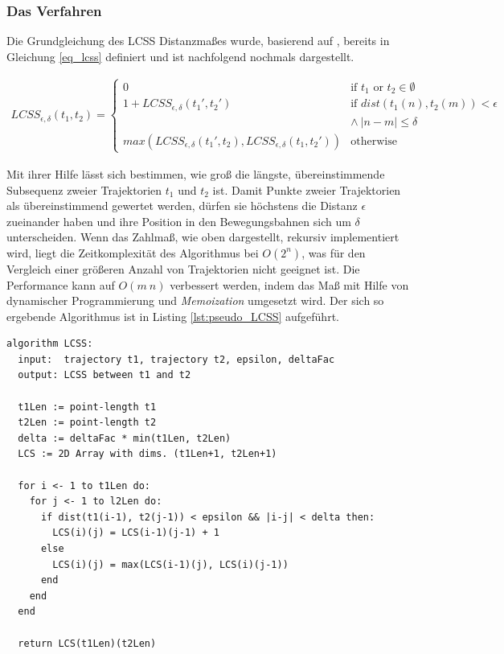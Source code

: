 \subsubsection{Das Verfahren}

Die Grundgleichung des LCSS Distanzmaßes wurde, basierend auf \cite[]{Vlachos2002}, bereits in Gleichung
\ref{eq_lcss} definiert und ist nachfolgend nochmals dargestellt.

\begin{ceqn}
\begin{align*}
\label{eq_lcss}
    LCSS_{\epsilon, \delta}(t_1, t_2) =
    \begin{cases}
        0 & \text{if } t_1 \text{ or } t_2 \in \emptyset \\
        1 + LCSS_{\epsilon, \delta}(t_1', t_2') & \text{if } dist(t_1(n), t_2(m)) < \epsilon \\
        & \land\ |n - m| \leq \delta \\
        max(LCSS_{\epsilon, \delta}(t_1', t_2), LCSS_{\epsilon, \delta}(t_1, t_2')) & \text{otherwise}
    \end{cases}
\end{align*}
\end{ceqn}

Mit ihrer Hilfe lässt sich bestimmen, wie groß die längste, übereinstimmende Subsequenz zweier Trajektorien
$t_1$ und $t_2$ ist. Damit Punkte zweier Trajektorien als übereinstimmend gewertet werden, dürfen sie
höchstens die Distanz $\epsilon$ zueinander haben und ihre Position in den Bewegungsbahnen sich um $\delta$
unterscheiden.
Wenn das Zahlmaß, wie oben dargestellt, rekursiv implementiert wird, liegt die Zeitkomplexität des Algorithmus
bei $O(2^n)$, was für den Vergleich einer größeren Anzahl von Trajektorien nicht geeignet ist. Die Performance
kann auf $O(m\ n)$ verbessert werden, indem das Maß mit Hilfe von dynamischer Programmierung und \textit{Memoization}
umgesetzt wird. Der sich so ergebende Algorithmus ist in Listing \ref{lst:pseudo_LCSS} aufgeführt.
\begin{lstlisting}[caption=Pseudocode LCSS Bestimmung, language=Pseudo, label=lst:pseudo_LCSS]
algorithm LCSS:
  input:  trajectory t1, trajectory t2, epsilon, deltaFac
  output: LCSS between t1 and t2

  t1Len := point-length t1
  t2Len := point-length t2
  delta := deltaFac * min(t1Len, t2Len)
  LCS := 2D Array with dims. (t1Len+1, t2Len+1)

  for i <- 1 to t1Len do:
    for j <- 1 to l2Len do:
      if dist(t1(i-1), t2(j-1)) < epsilon && |i-j| < delta then:
        LCS(i)(j) = LCS(i-1)(j-1) + 1
      else
        LCS(i)(j) = max(LCS(i-1)(j), LCS(i)(j-1))
      end
    end
  end

  return LCS(t1Len)(t2Len)
\end{lstlisting}

